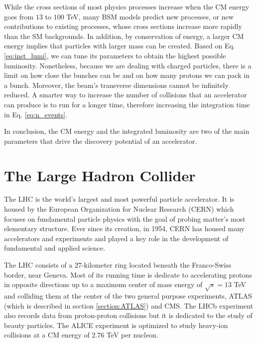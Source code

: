 While the cross sections of most physics processes increase when the CM energy goes from $13$ to $100$ TeV, many BSM models predict new processes, or new contributions to existing processes, whose cross sections increase more rapidly than the SM backgrounds. In addition, by conservation of energy, a larger CM energy implies that particles with larger mass can be created. Based on Eq. \ref{eq:inst_lumi}, we can tune its parameters to obtain the highest possible luminosity. Nonetheless, because we are dealing with charged particles, there is a limit on how close the bunches can be and on how many protons we can pack in a bunch. Moreover, the beam's transverse dimensions cannot be infinitely reduced. A smarter way to increase the number of collisions that an accelerator can produce is to run for a longer time, therefore increasing the integration time in Eq. \ref{eq:n_events}. 

In conclusion, the CM energy and the integrated luminosity are two of the main parameters that drive the discovery potential of an accelerator. 


\section{The Large Hadron Collider}
\label{section:LHC}

%


The LHC is the world's largest and most powerful particle accelerator. It is housed by the European Organization for Nuclear Research (CERN) which focuses on fundamental particle physics with the goal of probing matter's most elementary structure. Ever since its creation, in 1954, CERN has housed many accelerators and experiments and played a key role in the development of fundamental and applied science.


The LHC consists of a $27$-kilometer ring located beneath the Franco-Swiss border, near Geneva. Most of its running time is dedicate to accelerating protons in opposite directions up to a maximum center of mass energy of $\sqrt{s}=13$ TeV and colliding them at the center of the two general purpose experiments, ATLAS (which is described in section \ref{section:ATLAS}) and CMS. The LHCb experiment also records data from proton-proton collisions but it is dedicated to the study of beauty particles. The ALICE experiment is optimized to study heavy-ion collisions at a CM energy of $2.76$ TeV per nucleon.

